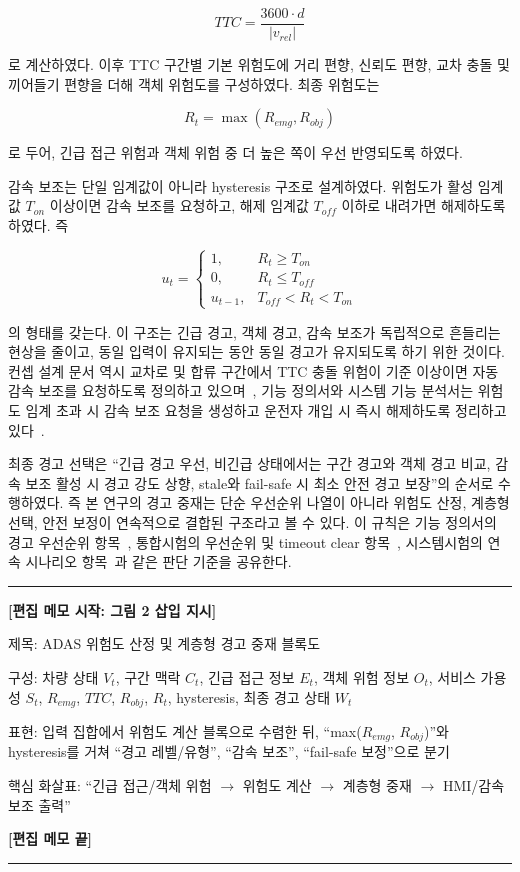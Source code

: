\documentclass[11pt,a4paper]{article}
\newenvironment{editmemo}[1]
{
\par\noindent\rule{\linewidth}{0.4pt}\par
\noindent\textbf{[편집 메모 시작: #1]}\par
\small\itshape
}
{
\par\normalsize\normalfont
\noindent\textbf{[편집 메모 끝]}\par
\noindent\rule{\linewidth}{0.4pt}\par
}
\begin{document}
\[
TTC=\frac{3600\cdot d}{|v_{rel}|}
\]

로 계산하였다. 이후 TTC 구간별 기본 위험도에 거리 편향, 신뢰도 편향, 교차 충돌 및 끼어들기 편향을 더해 객체 위험도를 구성하였다. 최종 위험도는

\[
R_t=\max(R_{emg},R_{obj})
\]

로 두어, 긴급 접근 위험과 객체 위험 중 더 높은 쪽이 우선 반영되도록 하였다.

감속 보조는 단일 임계값이 아니라 hysteresis 구조로 설계하였다. 위험도가 활성 임계값 $T_{on}$ 이상이면 감속 보조를 요청하고, 해제 임계값 $T_{off}$ 이하로 내려가면 해제하도록 하였다. 즉

\[
u_t=
\begin{cases}
1, & R_t \geq T_{on} \\
0, & R_t \leq T_{off} \\
u_{t-1}, & T_{off}<R_t<T_{on}
\end{cases}
\]

의 형태를 갖는다. 이 구조는 긴급 경고, 객체 경고, 감속 보조가 독립적으로 흔들리는 현상을 줄이고, 동일 입력이 유지되는 동안 동일 경고가 유지되도록 하기 위한 것이다. 컨셉 설계 문서 역시 교차로 및 합류 구간에서 TTC 충돌 위험이 기준 이상이면 자동 감속 보조를 요청하도록 정의하고 있으며~\cite{concept_design}, 기능 정의서와 시스템 기능 분석서는 위험도 임계 초과 시 감속 보조 요청을 생성하고 운전자 개입 시 즉시 해제하도록 정리하고 있다~\cite{func_def,sysfunc_analysis}.

최종 경고 선택은 ``긴급 경고 우선, 비긴급 상태에서는 구간 경고와 객체 경고 비교, 감속 보조 활성 시 경고 강도 상향, stale와 fail-safe 시 최소 안전 경고 보장''의 순서로 수행하였다. 즉 본 연구의 경고 중재는 단순 우선순위 나열이 아니라 위험도 산정, 계층형 선택, 안전 보정이 연속적으로 결합된 구조라고 볼 수 있다. 이 규칙은 기능 정의서의 경고 우선순위 항목~\cite{func_def}, 통합시험의 우선순위 및 timeout clear 항목~\cite{integration_test}, 시스템시험의 연속 시나리오 항목~\cite{system_test}과 같은 판단 기준을 공유한다.

\begin{editmemo}{그림 2 삽입 지시}
제목: ADAS 위험도 산정 및 계층형 경고 중재 블록도

구성: 차량 상태 $V_t$, 구간 맥락 $C_t$, 긴급 접근 정보 $E_t$, 객체 위험 정보 $O_t$, 서비스 가용성 $S_t$, $R_{emg}$, $TTC$, $R_{obj}$, $R_t$, hysteresis, 최종 경고 상태 $W_t$

표현: 입력 집합에서 위험도 계산 블록으로 수렴한 뒤, ``max($R_{emg}$, $R_{obj}$)''와 hysteresis를 거쳐 ``경고 레벨/유형'', ``감속 보조'', ``fail-safe 보정''으로 분기

핵심 화살표: ``긴급 접근/객체 위험 $\rightarrow$ 위험도 계산 $\rightarrow$ 계층형 중재 $\rightarrow$ HMI/감속 보조 출력''
\end{editmemo}
\end{document}

